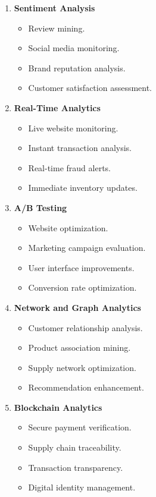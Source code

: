 \documentclass[12pt]{article}
\begin{document}
\begin{enumerate}
\item \textbf{Sentiment Analysis}
\begin{itemize}
    \item Review mining.
    \item Social media monitoring.
    \item Brand reputation analysis.
    \item Customer satisfaction assessment.
\end{itemize}

\item \textbf{Real-Time Analytics}
\begin{itemize}
    \item Live website monitoring.
    \item Instant transaction analysis.
    \item Real-time fraud alerts.
    \item Immediate inventory updates.
\end{itemize}

\item \textbf{A/B Testing}
\begin{itemize}
    \item Website optimization.
    \item Marketing campaign evaluation.
    \item User interface improvements.
    \item Conversion rate optimization.
\end{itemize}

\item \textbf{Network and Graph Analytics}
\begin{itemize}
    \item Customer relationship analysis.
    \item Product association mining.
    \item Supply network optimization.
    \item Recommendation enhancement.
\end{itemize}

\item \textbf{Blockchain Analytics}
\begin{itemize}
    \item Secure payment verification.
    \item Supply chain traceability.
    \item Transaction transparency.
    \item Digital identity management.
\end{itemize}

\end{enumerate}
\end{document}
